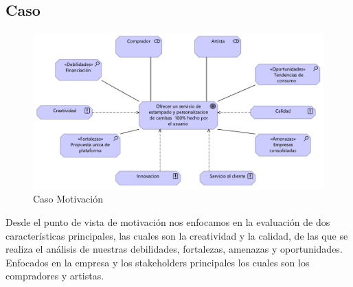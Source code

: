 \begin{center}
  \begin{minipage}{1\textwidth}
\subsection{Caso}
\begin{figure}[H]
	\centering	
    \includegraphics[width=1.1\linewidth]{imgs/Caso 6.pdf}
	\caption{Caso Motivación}	
 \end{figure}

Desde el punto de vista de motivación nos enfocamos en la evaluación de dos características principales, las cuales son la creatividad y la calidad, de las que se realiza el análisis de nuestras debilidades, fortalezas, amenazas y oportunidades. Enfocados en la empresa y los stakeholders principales los cuales son los compradores y artistas.

\end{minipage}
\end{center}